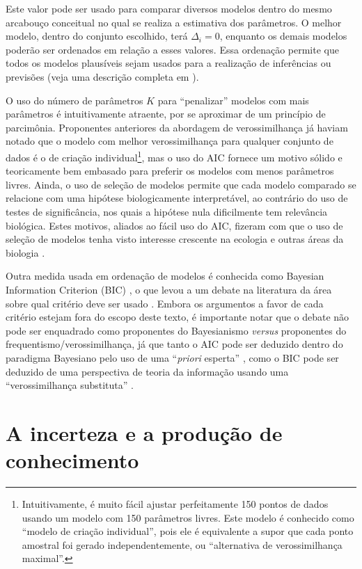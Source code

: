 Este valor pode ser usado para comparar diversos modelos dentro do mesmo arcabouço conceitual no qual se realiza a
estimativa dos parâmetros. O melhor modelo, dentro do conjunto escolhido, terá $\Delta_i = 0$, enquanto os demais
modelos poderão ser ordenados em relação a esses valores. Essa ordenação permite que todos os modelos plausíveis
sejam usados para a realização de inferências ou previsões (veja uma descrição completa em \citep{Burnham02}).

O uso do número de parâmetros $K$ para ``penalizar'' modelos com mais parâmetros é intuitivamente atraente, por
se aproximar de um princípio de parcimônia. Proponentes anteriores da abordagem de verossimilhança já haviam notado
que o modelo com melhor verossimilhança para qualquer conjunto de dados é o de criação individual\footnote{
Intuitivamente, é muito fácil ajustar perfeitamente 150 pontos de dados usando um modelo com 150 parâmetros 
livres. Este modelo é conhecido como ``modelo de criação individual'', pois ele é equivalente a supor que 
cada ponto amostral foi gerado independentemente, ou ``alternativa de verossimilhança maximal''.}, 
mas o uso do AIC
fornece um motivo sólido e teoricamente bem embasado para preferir os modelos com menos parâmetros livres.
Ainda, o uso de seleção de modelos permite que cada modelo comparado se relacione com uma hipótese biologicamente
interpretável, ao contrário do uso de testes de significância, nos quais a hipótese nula dificilmente tem relevância
biológica. Estes motivos, aliados ao fácil uso do AIC, fizeram com que o uso de seleção de modelos tenha
visto interesse crescente na ecologia e outras áreas da biologia \citep{Johnson04}.

Outra medida usada em ordenação de modelos é conhecida como Bayesian Information Criterion (BIC) \citep{Schwarz78},
o que levou a um debate na literatura da área sobre qual critério deve ser usado \citep{Weakliem99}. Embora os
argumentos a favor de cada critério estejam fora do escopo deste texto, é importante notar que o debate não pode
ser enquadrado como proponentes do Bayesianismo {\em versus} proponentes do frequentismo/verossimilhança, já que
tanto o AIC pode ser deduzido dentro do paradigma Bayesiano pelo uso de uma ``{\em priori} esperta'' 
\citep{Burnham04}, como o BIC pode ser deduzido de uma perspectiva de teoria da informação usando uma 
``verossimilhança substituta'' \citep{Stoica04}.

\section{A incerteza e a produção de conhecimento}\label{sec:ciencia} 


